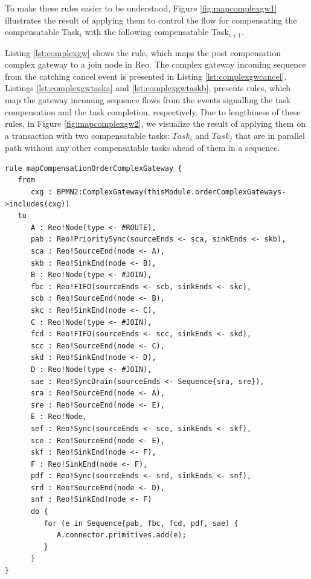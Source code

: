  To make these rules easier to be understood, Figure \ref{fig:mapcomplexgw1} illustrates the result of applying them to control the flow for compensating the compensatable Task$_i$ with the following compensatable Task$_{i+1}$.

 Listing \ref{lst:complexgw} shows the rule, which maps the post compensation complex gateway to a join node in Reo. The complex gateway incoming sequence from the catching cancel event is presented in Listing \ref{lst:complexgwcancel}. Listings \ref{lst:complexgwtaska} and \ref{lst:complexgwtaskb}, presents rules, which map the gateway incoming sequence flows from the events signalling the task compensation and the task completion, respectively. Due to lengthiness of these rules, in Figure \ref{fig:mapcomplexgw2}, we visualize the result of applying them on a transaction with two compensatable tasks: $Task_i$ and $Task_j$ that are in parallel path without any other compensatable tasks ahead of them in a sequence. 

\begin{lstlisting}[float,frame=single,caption=Mapping the generated compensation order complex gateway,label=lst:complexgwtype1]
rule mapCompensationOrderComplexGateway {
   from
      cxg : BPMN2:ComplexGateway(thisModule.orderComplexGateways->includes(cxg))
   to
      A : Reo!Node(type <- #ROUTE),
      pab : Reo!PrioritySync(sourceEnds <- sca, sinkEnds <- skb),
      sca : Reo!SourceEnd(node <- A),
      skb : Reo!SinkEnd(node <- B),
      B : Reo!Node(type <- #JOIN),
      fbc : Reo!FIFO(sourceEnds <- scb, sinkEnds <- skc),
      scb : Reo!SourceEnd(node <- B),
      skc : Reo!SinkEnd(node <- C),
      C : Reo!Node(type <- #JOIN),
      fcd : Reo!FIFO(sourceEnds <- scc, sinkEnds <- skd),
      scc : Reo!SourceEnd(node <- C),
      skd : Reo!SinkEnd(node <- D),
      D : Reo!Node(type <- #JOIN),
      sae : Reo!SyncDrain(sourceEnds <- Sequence{sra, sre}),
      sra : Reo!SourceEnd(node <- A),
      sre : Reo!SourceEnd(node <- E),
      E : Reo!Node,
      sef : Reo!Sync(sourceEnds <- sce, sinkEnds <- skf),
      sce : Reo!SourceEnd(node <- E),
      skf : Reo!SinkEnd(node <- F),
      F : Reo!SinkEnd(node <- F),
      pdf : Reo!Sync(sourceEnds <- srd, sinkEnds <- snf),
      srd : Reo!SourceEnd(node <- D),
      snf : Reo!SinkEnd(node <- F)
      do {
         for (e in Sequence{pab, fbc, fcd, pdf, sae) {       
            A.connector.primitives.add(e);
         }
      }
}
\end{lstlisting}

